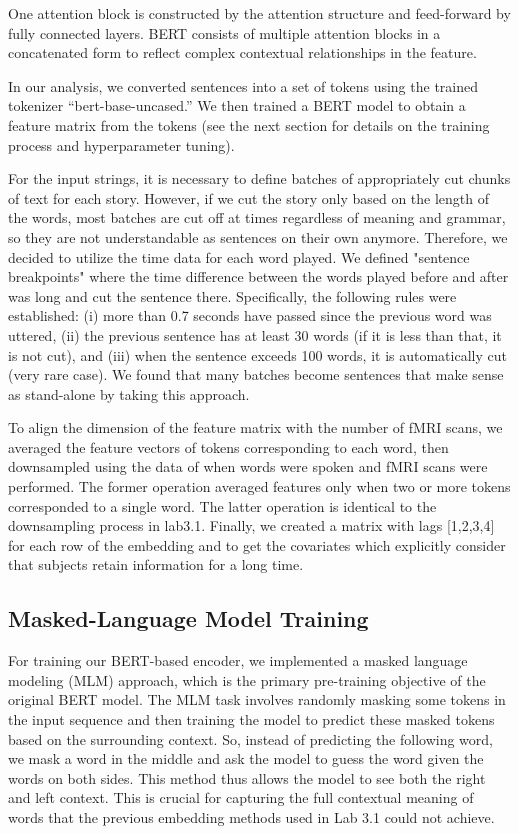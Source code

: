 \documentclass[12pt,letterpaper]{article}
\begin{document}
One attention block is constructed by the attention structure and feed-forward by fully connected layers. BERT consists of multiple attention blocks in a concatenated form to reflect complex contextual relationships in the feature.

In our analysis, we converted sentences into a set of tokens using the trained tokenizer “bert-base-uncased.” We then trained a BERT model to obtain a feature matrix from the tokens (see the next section for details on the training process and hyperparameter tuning).

For the input strings, it is necessary to define batches of appropriately cut chunks of text for each story. However, if we cut the story only based on the length of the words, most batches are cut off at times regardless of meaning and grammar, so they are not understandable as sentences on their own anymore. Therefore, we decided to utilize the time data for each word played. We defined "sentence breakpoints" where the time difference between the words played before and after was long and cut the sentence there. Specifically, the following rules were established: (i) more than 0.7 seconds have passed since the previous word was uttered, (ii) the previous sentence has at least 30 words (if it is less than that, it is not cut), and (iii) when the sentence exceeds 100 words, it is automatically cut (very rare case). We found that many batches become sentences that make sense as stand-alone by taking this approach.

To align the dimension of the feature matrix with the number of fMRI scans, we averaged the feature vectors of tokens corresponding to each word, then downsampled using the data of when words were spoken and fMRI scans were performed. The former operation averaged features only when two or more tokens corresponded to a single word. The latter operation is identical to the downsampling process in lab3.1. Finally, we created a matrix with lags [1,2,3,4] for each row of the embedding and to get the covariates which explicitly consider that subjects retain information for a long time.

\subsection{Masked-Language Model Training}

For training our BERT-based encoder, we implemented a masked language modeling (MLM) approach, which is the primary pre-training objective of the original BERT model. The MLM task involves randomly masking some tokens in the input sequence and then training the model to predict these masked tokens based on the surrounding context. So, instead of predicting the following word, we mask a word in the middle and ask the model to guess the word given the words on both sides. This method thus allows the model to see both the right and left context. This is crucial for capturing the full contextual meaning of words that the previous embedding methods used in Lab 3.1 could not achieve.
\end{document}
